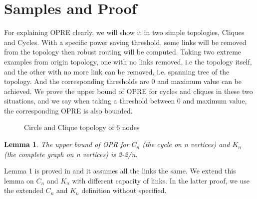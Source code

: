 \documentclass[conference]{IEEEtran}
\newtheorem{lemma}[theorem]{Lemma}
\begin{document}
\section{Samples and Proof}
For explaining OPRE clearly, we will show it in two simple topologies, Cliques and Cycles. With a specific power saving 
threshold, some links will be removed from the topology then robust routing will be computed. Taking two extreme examples from 
origin topology, one with no links removed, i.e the topology itself, and the other with no more link can be removed, i.e. 
spanning tree of the topology. And the corresponding thresholds are 0 and maximum value can be achieved. We prove the upper 
bound of OPRE for cycles and cliques in these two situations, and we say when taking a threshold between 0 and maximum value,
the corresponding OPRE is also bounded.


\begin{figure}[!t]
\centering
\vspace*{0.1in}
\hfill
{}
\caption{Circle and Clique topology of 6 nodes}
\vspace*{0.1in}
\end{figure}

\begin{lemma}
The upper bound of OPR for $C_n$ (the cycle on n vertices) and $K_n$ (the complete graph on n vertices) is 2-2/n.
\end{lemma}

Lemma 1 is proved in \cite{networking:oblivious} and it assumes all the links the same. We extend this lemma on $C_n$ and
$K_n$ with different capacity of links. In the latter proof, we use the extended $C_n$ and $K_n$ definition without specified.
\end{document}
